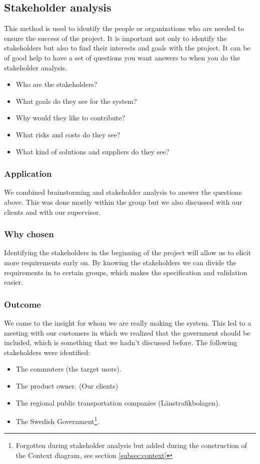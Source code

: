 \documentclass[a4paper]{article}
\begin{document}
		\subsection{Stakeholder analysis}
 This method is used to identify the people or organizations who are needed to ensure the success of the project. It is important not only to identify the stakeholders but also to find their interests and goals with the project. It can be of good help to have a set of questions you want answers to when you do the stakeholder analysis.

		\begin{itemize}
			\item Who are the stakeholders?
			\item What goals do they see for the system?
			\item Why would they like to contribute?
			\item What risks and costs do they see?
			\item What kind of solutions and suppliers do they see?
		\end{itemize}
		
		\subsubsection{Application}
 We combined brainstorming and stakeholder analysis to answer the questions above. This was done mostly within the group but we also discussed with our clients and with our supervisor.
		\subsubsection{Why chosen}
		Identifying the stakeholders in the beginning of the project will allow us to elicit more requirements early on. By knowing the stakeholders we can divide the requirements in to certain groups, which makes the specification and validation easier.
		\subsubsection{Outcome}
We came to the insight for whom we are really making the system. This led to a meeting with our customers in which we realized that the government should be included, which is something that we hadn't discussed before.
	The following stakeholders were identified:

		\begin{itemize}
			\item The commuters (the target users).
			\item The product owner. (Our clients)
			\item The regional public transportation companies (Länstrafikbolagen). 
			\item The Swedish Government\footnote{Forgotten during stakeholder analysis but added during the construction of the Context diagram, see section \ref{subsec:context}}.
		\end{itemize}
				
\end{document}
